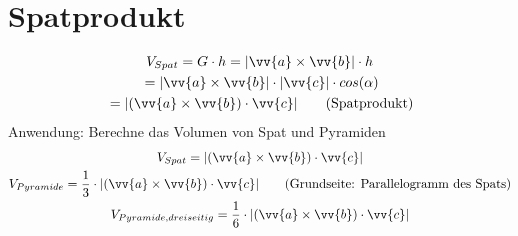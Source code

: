 \section{Spatprodukt}
\begin{gather*}
  V_{Spat} = G \cdot h = |\vv{a} \times \vv{b}| \cdot h \\
  \;= |\vv{a} \times \vv{b}| \cdot |\vv{c}| \cdot cos(\alpha) \\
  \;= |(\vv{a} \times \vv{b}) \cdot \vv{c}| \qquad \text{(Spatprodukt)}
\end{gather*}
Anwendung: Berechne das Volumen von Spat und Pyramiden
\begin{gather*}
  V_{Spat} = |(\vv{a} \times \vv{b}) \cdot \vv{c}| \\
  V_{Pyramide} = \frac{1}{3} \cdot |(\vv{a} \times \vv{b}) \cdot \vv{c}| \qquad \text{(Grundseite: Parallelogramm des Spats)} \\
  V_{Pyramide,dreiseitig} = \frac{1}{6} \cdot |(\vv{a} \times \vv{b}) \cdot \vv{c}|
\end{gather*}
